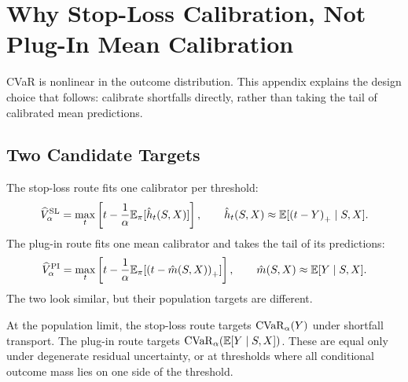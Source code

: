 \section{Why Stop-Loss Calibration, Not Plug-In Mean Calibration}
\label{app:calibrator-target}
\label{app:stoploss-vs-plugin}

CVaR is nonlinear in the outcome distribution. This appendix explains the
design choice that follows: calibrate shortfalls directly, rather than taking
the tail of calibrated mean predictions.

\subsection{Two Candidate Targets}

The stop-loss route fits one calibrator per threshold:
\begin{equation}
\widehat V^{\mathrm{SL}}_\alpha
=\max_t\left[
t-\frac{1}{\alpha}\mathbb{E}_\pi[\hat h_t(S,X)]
\right],
\qquad
\hat h_t(S,X)\approx
\mathbb{E}[\left(t-Y\right)_{+}\mid S,X].
\label{eq:app-stoploss}
\end{equation}
The plug-in route fits one mean calibrator and takes the tail of its
predictions:
\begin{equation}
\widehat V^{\mathrm{PI}}_\alpha
=\max_t\left[
t-\frac{1}{\alpha}
\mathbb{E}_\pi[\left(t-\hat m(S,X)\right)_{+}]
\right],
\qquad
\hat m(S,X)\approx\mathbb{E}[Y\mid S,X].
\label{eq:app-plugin}
\end{equation}
The two look similar, but their population targets are different.

\begin{proposition}
\label{prop:plugin-target}
At the population limit, the stop-loss route targets $\mathrm{CVaR}_\alpha(Y)$ under
shortfall transport. The plug-in route targets
$\mathrm{CVaR}_\alpha(\mathbb{E}[Y\mid S,X])$. These are equal only under degenerate
residual uncertainty, or at thresholds where all conditional outcome mass lies
on one side of the threshold.
\end{proposition}

\begin{twocolproof}
\end{twocolproof}

